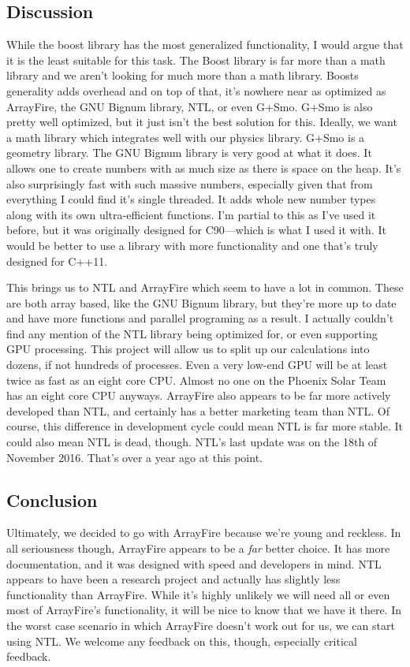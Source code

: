 \documentclass[onecolumn, draftclsnofoot,10pt, compsoc]{IEEEtran}
\begin{document}
\begin{singlespace}
\subsection{Discussion}
While the boost library has the most generalized functionality, I would argue that it is the least suitable for this task.
The Boost library is far more than a math library and we aren't looking for much more than a math library.
Boosts generality adds overhead and on top of that, it's nowhere near as optimized as ArrayFire, the GNU Bignum library, NTL, or even G+Smo.
G+Smo is also pretty well optimized, but it just isn't the best solution for this.
Ideally, we want a math library which integrates well with our physics library.
G+Smo is a geometry library.
The GNU Bignum library is very good at what it does.
It allows one to create numbers with as much size as there is space on the heap.
It's also surprisingly fast with such massive numbers, especially given that from everything I could find it's single threaded.
It adds whole new number types along with its own ultra-efficient functions.
I'm partial to this as I've used it before, but it was originally designed for C90---which is what I used it with.
It would be better to use a library with more functionality and one that's truly designed for C++11.

This brings us to NTL and ArrayFire which seem to have a lot in common.
These are both array based, like the GNU Bignum library, but they're more up to date and have more functions and parallel programing as a result.
I actually couldn't find any mention of the NTL library being optimized for, or even supporting GPU processing.
This project will allow us to split up our calculations into dozens, if not hundreds of processes.
Even a very low-end GPU will be at least twice as fast as an eight core CPU. Almost no one on the Phoenix Solar Team has an eight core CPU anyways.
ArrayFire also appears to be far more actively developed than NTL, and certainly has a better marketing team than NTL.
Of course, this difference in development cycle could mean NTL is far more stable.
It could also mean NTL is dead, though.
NTL's last update was on the 18th of November 2016.
That's over a year ago at this point.


\subsection{Conclusion}
Ultimately, we decided to go with ArrayFire because we're young and reckless.
In all seriousness though, ArrayFire appears to be a \textit{far} better choice.
It has more documentation, and it was designed with speed and developers in mind.
NTL appears to have been a research project and actually has slightly less functionality than ArrayFire.
While it's highly unlikely we will need all or even most of ArrayFire's functionality, it will be nice to know that we have it there.
In the worst case scenario in which ArrayFire doesn't work out for us, we can start using NTL.
We welcome any feedback on this, though, especially critical feedback.


\end{singlespace}
\end{document}

